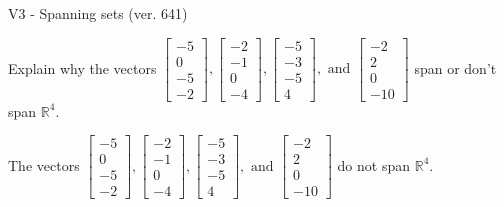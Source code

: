 \begin{exercise}
  \begin{exerciseTitle}V3 - Spanning sets (ver. 641)\end{exerciseTitle}
  \begin{exerciseStatement}
    Explain why the vectors \(\left[\begin{array}{r}
-5 \\
0 \\
-5 \\
-2
\end{array}\right] , \left[\begin{array}{r}
-2 \\
-1 \\
0 \\
-4
\end{array}\right] , \left[\begin{array}{r}
-5 \\
-3 \\
-5 \\
4
\end{array}\right] , \text{ and } \left[\begin{array}{r}
-2 \\
2 \\
0 \\
-10
\end{array}\right]\) span or don't span \(\mathbb{R}^4\). 
	


  \end{exerciseStatement}
  \begin{exerciseAnswer}
   The vectors \(\left[\begin{array}{r}
-5 \\
0 \\
-5 \\
-2
\end{array}\right] , \left[\begin{array}{r}
-2 \\
-1 \\
0 \\
-4
\end{array}\right] , \left[\begin{array}{r}
-5 \\
-3 \\
-5 \\
4
\end{array}\right] , \text{ and } \left[\begin{array}{r}
-2 \\
2 \\
0 \\
-10
\end{array}\right]\) 
  	 do not  
	span \(\mathbb{R}^4\).
  


  \end{exerciseAnswer}
\end{exercise}